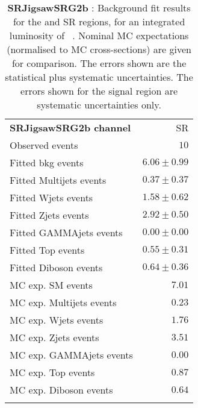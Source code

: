 

\begin{table}
\begin{center}
\setlength{\tabcolsep}{0.0pc}
{\tiny
\begin{tabular*}{\textwidth}{@{\extracolsep{\fill}}lr}
\noalign{\smallskip}\hline\noalign{\smallskip}
{\bf SRJigsawSRG2b channel}           & SR              \\[-0.05cm]
\noalign{\smallskip}\hline\noalign{\smallskip}
Observed events          & $10$                    \\
\noalign{\smallskip}\hline\noalign{\smallskip}
Fitted bkg events         & $6.06 \pm 0.99$              \\
\noalign{\smallskip}\hline\noalign{\smallskip}
        Fitted Multijets events         & $0.37 \pm 0.37$              \\
        Fitted Wjets events         & $1.58 \pm 0.62$              \\
        Fitted Zjets events         & $2.92 \pm 0.50$              \\
        Fitted GAMMAjets events         & $0.00 \pm 0.00$              \\
        Fitted Top events         & $0.55 \pm 0.31$              \\
        Fitted Diboson events         & $0.64 \pm 0.36$              \\
 \noalign{\smallskip}\hline\noalign{\smallskip}
MC exp. SM events              & $7.01$              \\
\noalign{\smallskip}\hline\noalign{\smallskip}
        MC exp. Multijets events         & $0.23$              \\
        MC exp. Wjets events         & $1.76$              \\
        MC exp. Zjets events         & $3.51$              \\
        MC exp. GAMMAjets events         & $0.00$              \\
        MC exp. Top events         & $0.87$              \\
        MC exp. Diboson events         & $0.64$              \\
\noalign{\smallskip}\hline\noalign{\smallskip}
\end{tabular*}
}
\end{center}
\caption{{\bf SRJigsawSRG2b} : Background fit results for the  and SR regions, for an integrated luminosity of \ourintlumi~\ifb. Nominal MC expectations (normalised to MC cross-sections) are given for comparison. The errors shown are the statistical plus systematic uncertainties. The errors shown for the signal region are systematic uncertainties only.}
\label{table.results.systematics.in.logL.fit.SR.SRJigsawSRG2b}
\end{table}
%